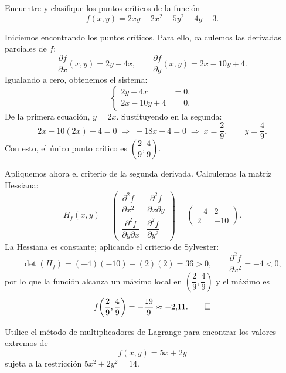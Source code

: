 \documentclass[11pt,respuestas,a4]{aleph-examen}
\begin{document}
\begin{preguntas}

\item
Encuentre y clasifique los puntos críticos de la función
\[
    f(x,y) = 2xy - 2x^2 - 5y^2 + 4y - 3.
\]

\begin{respuesta}
Iniciemos encontrando los puntos críticos. Para ello, calculemos las derivadas parciales de $f$:
\[
    \frac{\partial f}{\partial x}(x,y) = 2y - 4x,
    \qquad
    \frac{\partial f}{\partial y}(x,y) = 2x - 10y + 4.
\]
Igualando a cero, obtenemos el sistema:
\[
    \left\{
    \begin{aligned}
        2y - 4x &= 0,\\
        2x - 10y + 4 &= 0.
    \end{aligned}
    \right.
\]
De la primera ecuación, $y = 2x$. Sustituyendo en la segunda:
\[
    2x - 10(2x) + 4 = 0
    \;\Longrightarrow\;
    -18x + 4 = 0
    \;\Longrightarrow\;
    x = \frac{2}{9},
    \qquad
    y = \frac{4}{9}.
\]
Con esto, el único punto crítico es $\left(\dfrac{2}{9},\dfrac{4}{9}\right)$.

Apliquemos ahora el criterio de la segunda derivada. Calculemos la matriz Hessiana:
\[
    H_f(x,y)
    =
    \begin{pmatrix}
        \dfrac{\partial^2 f}{\partial x^2} & \dfrac{\partial^2 f}{\partial x\partial y}\\[10pt]
        \dfrac{\partial^2 f}{\partial y\partial x} & \dfrac{\partial^2 f}{\partial y^2}
    \end{pmatrix}
    =
    \begin{pmatrix}
        -4 & 2\\
        2 & -10
    \end{pmatrix}.
\]
La Hessiana es constante; aplicando el criterio de Sylvester:
\[
    \det(H_f) = (-4)(-10) - (2)(2) = 36 > 0,
    \qquad
    \frac{\partial^2 f}{\partial x^2} = -4 < 0,
\]
por lo que la función alcanza un {máximo} local en $\left(\dfrac{2}{9},\dfrac{4}{9}\right)$ y el máximo es
\[
    f\!\left(\frac{2}{9},\frac{4}{9}\right) = -\frac{19}{9} \approx -2{,}11.\qedhere
\]
\end{respuesta}


\item
Utilice el método de multiplicadores de Lagrange para encontrar los valores extremos de
\[
    f(x,y) = 5x + 2y
\]
sujeta a la restricción $5x^2 + 2y^2 = 14$.


\end{preguntas}
\end{document}
